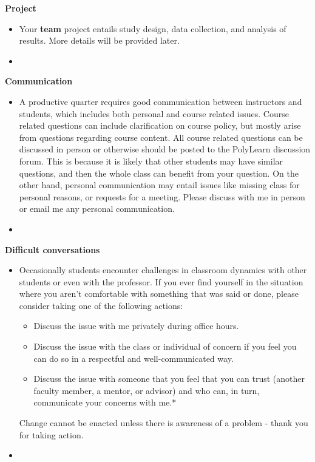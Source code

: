 \documentclass[letterpaper,12pt]{report}
\begin{document}
\textbf{Project}
\begin{itemize}
\item[] Your \textbf{team} project entails study design, data collection, and analysis of results. More details will be provided later.
\item[]
\end{itemize}


\textbf{Communication}
\begin{itemize}
\item[]
A productive quarter requires good communication between instructors and students, which includes both personal and course related issues. Course related questions can include clarification on course policy, but mostly arise from questions regarding course content. All course related questions can be discussed in person or otherwise should be posted to the PolyLearn discussion forum. This is because it is likely that other students may have similar questions, and then the whole class can benefit from your question. On the other hand, personal communication may entail issues like missing class for personal reasons, or requests for a meeting. Please discuss with me in person or email me any personal communication.
\item[]
\end{itemize}

\textbf{Difficult conversations}
\begin{itemize}
\item[]
Occasionally students encounter challenges in classroom dynamics with other students or even with the professor.  If you ever find yourself in the situation where you aren't comfortable with something that was said or done, please consider taking one of the following actions:
\begin{itemize}
\item Discuss the issue with me privately during office hours.
\item Discuss the issue with the class or individual of concern if you feel you can do so in a respectful and well-communicated way.
\item Discuss the issue with someone that you feel that you can trust (another faculty member, a mentor, or advisor) and who can, in turn, communicate your concerns with me.*
\end{itemize}
Change cannot be enacted unless there is awareness of a problem - thank you for taking action.
\item[]
\end{itemize}
\end{document}

